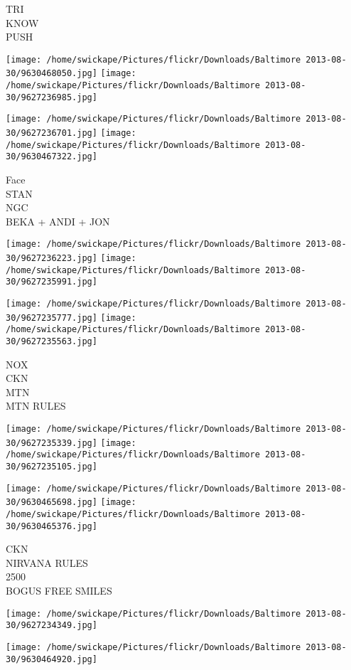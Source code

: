 \documentclass[10pt,letterpaper]{article}
\begin{document}
TRI\\
KNOW\\
PUSH
\pagebreak

\texttt{[image: /home/swickape/Pictures/flickr/Downloads/Baltimore 2013-08-30/9630468050.jpg]}
\texttt{[image: /home/swickape/Pictures/flickr/Downloads/Baltimore 2013-08-30/9627236985.jpg]}

\texttt{[image: /home/swickape/Pictures/flickr/Downloads/Baltimore 2013-08-30/9627236701.jpg]}
\texttt{[image: /home/swickape/Pictures/flickr/Downloads/Baltimore 2013-08-30/9630467322.jpg]}

Face\\
STAN\\
NGC\\
BEKA + ANDI + JON
\pagebreak

\texttt{[image: /home/swickape/Pictures/flickr/Downloads/Baltimore 2013-08-30/9627236223.jpg]}
\texttt{[image: /home/swickape/Pictures/flickr/Downloads/Baltimore 2013-08-30/9627235991.jpg]}

\texttt{[image: /home/swickape/Pictures/flickr/Downloads/Baltimore 2013-08-30/9627235777.jpg]}
\texttt{[image: /home/swickape/Pictures/flickr/Downloads/Baltimore 2013-08-30/9627235563.jpg]}

NOX\\
CKN\\
MTN\\
MTN RULES
\pagebreak

\texttt{[image: /home/swickape/Pictures/flickr/Downloads/Baltimore 2013-08-30/9627235339.jpg]}
\texttt{[image: /home/swickape/Pictures/flickr/Downloads/Baltimore 2013-08-30/9627235105.jpg]}

\texttt{[image: /home/swickape/Pictures/flickr/Downloads/Baltimore 2013-08-30/9630465698.jpg]}
\texttt{[image: /home/swickape/Pictures/flickr/Downloads/Baltimore 2013-08-30/9630465376.jpg]}

CKN\\
NIRVANA RULES\\
2500\\
BOGUS FREE SMILES
\pagebreak

\texttt{[image: /home/swickape/Pictures/flickr/Downloads/Baltimore 2013-08-30/9627234349.jpg]}

\vspace{0.25in}
\texttt{[image: /home/swickape/Pictures/flickr/Downloads/Baltimore 2013-08-30/9630464920.jpg]}
\end{document}
